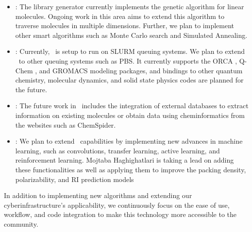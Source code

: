 \begin{itemize}
	\item \chemlg: The library generator currently implements the genetic algorithm for linear molecules. Ongoing work in this area aims to extend this algorithm to traverse molecules in multiple dimensions. Further, we plan to implement other smart algorithms such as Monte Carlo search and Simulated Annealing. 
	\item \chemhtps: Currently, \chemhtps\ is setup to run on SLURM queuing systems. We plan to extend \chemhtps\ to other queuing systems such as PBS. It currently supports the ORCA \cite{Neese2012}, Q-Chem \cite{Shao2014}, and GROMACS \cite{ABRAHAM201519} modeling packages, and bindings to other quantum chemistry, molecular dynamics, and solid state physics codes are planned for the future.
	\item \chembddb: The future work in \chembddb\ includes the integration of external databases to extract information on existing molecules or obtain data using cheminformatics from the websites such as ChemSpider. 
	\item \chemml:  We plan to extend \chemml\ capabilities by implementing new advances in machine learning, such as convolutions, transfer learning, active learning, and reinforcement learning. Mojtaba Haghighatlari is taking a lead on adding these functionalities as well as applying them to improve the packing density, polarizability, and RI prediction models
\end{itemize}

In addition to implementing new algorithms and extending our cyberinfrastructure's applicability, we continuously focus on the ease of use, workflow, and code integration to make this technology more accessible to the community.